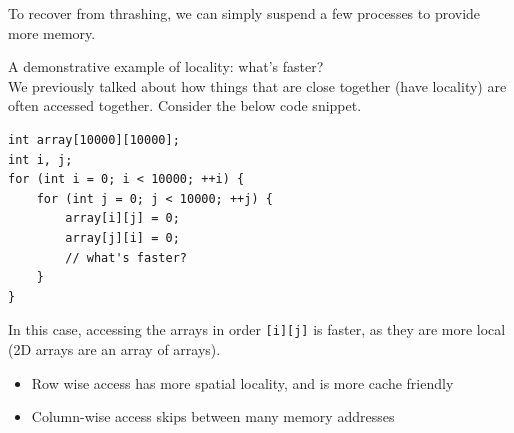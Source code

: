\documentclass[journal, letterpaper]{IEEEtran}
\begin{document}
To recover from thrashing, we can simply suspend a few processes to provide more memory.
\begin{example}{A demonstrative example of locality: what's faster?} \\ 
    We previously talked about how things that are close together (have locality) are often accessed together. Consider the below code snippet.
    \begin{verbatim}
int array[10000][10000];
int i, j;
for (int i = 0; i < 10000; ++i) {
    for (int j = 0; j < 10000; ++j) {
        array[i][j] = 0;
        array[j][i] = 0;
        // what's faster?
    }
}\end{verbatim}
    In this case, accessing the arrays in order \verb|[i][j]| is faster, as they are more local (2D arrays are an array of arrays).
    \begin{itemize}
        \item Row wise access has more spatial locality, and is more cache friendly
        \item Column-wise access skips between many memory addresses
    \end{itemize}
\end{example}
\end{document}
